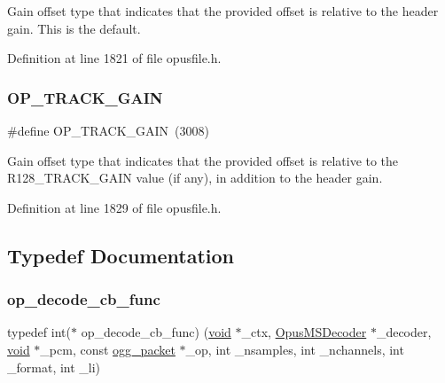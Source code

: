 Gain offset type that indicates that the provided offset is relative to the header gain. This is the default. 

Definition at line 1821 of file opusfile.\+h.

\mbox{\label{group__stream__decoding_ga51082f7c661488bce9bfdf0e5401fabf}} 
\subsubsection{\texorpdfstring{OP\_TRACK\_GAIN}{OP\_TRACK\_GAIN}}
{\footnotesize\ttfamily \#define O\+P\+\_\+\+T\+R\+A\+C\+K\+\_\+\+G\+A\+IN~(3008)}

Gain offset type that indicates that the provided offset is relative to the R128\+\_\+\+T\+R\+A\+C\+K\+\_\+\+G\+A\+IN value (if any), in addition to the header gain. 

Definition at line 1829 of file opusfile.\+h.



\subsection{Typedef Documentation}
\mbox{\label{group__stream__decoding_ga81a50874a82484034c22dfeddce177e1}} 
\subsubsection{\texorpdfstring{op\_decode\_cb\_func}{op\_decode\_cb\_func}}
{\footnotesize\ttfamily typedef int($\ast$ op\+\_\+decode\+\_\+cb\+\_\+func) (\mbox{\hyperlink{_s_d_l__opengles2__gl2ext_8h_ae5d8fa23ad07c48bb609509eae494c95}{void}} $\ast$\+\_\+ctx, \mbox{\hyperlink{group__opus__multistream_gad3497495deb9a8ace82e76cd4f93e0e4}{Opus\+M\+S\+Decoder}} $\ast$\+\_\+decoder, \mbox{\hyperlink{_s_d_l__opengles2__gl2ext_8h_ae5d8fa23ad07c48bb609509eae494c95}{void}} $\ast$\+\_\+pcm, const \mbox{\hyperlink{structogg__packet}{ogg\+\_\+packet}} $\ast$\+\_\+op, int \+\_\+nsamples, int \+\_\+nchannels, int \+\_\+format, int \+\_\+li)}

